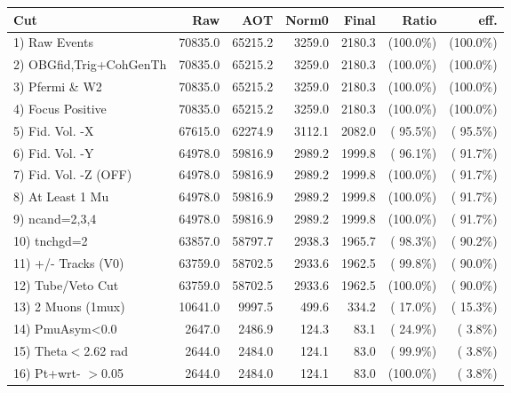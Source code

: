  \begin{table}[h!]\centering
 \begin{tabular}{||l||r|r|r|r|r|r||}
 \hline
 \hline
 Cut & Raw & AOT & Norm0 & Final & Ratio & eff.       \\
 \hline
  1) Raw Events           &      70835.0 &      65215.2 &       3259.0 &       2180.3 & (100.0\%) & (100.0\%) \\
  2) OBGfid,Trig+CohGenTh &      70835.0 &      65215.2 &       3259.0 &       2180.3 & (100.0\%) & (100.0\%) \\
  3) Pfermi \& W2         &      70835.0 &      65215.2 &       3259.0 &       2180.3 & (100.0\%) & (100.0\%) \\
  4) Focus Positive       &      70835.0 &      65215.2 &       3259.0 &       2180.3 & (100.0\%) & (100.0\%) \\
  5) Fid. Vol. -X         &      67615.0 &      62274.9 &       3112.1 &       2082.0 & ( 95.5\%) & ( 95.5\%) \\
  6) Fid. Vol. -Y         &      64978.0 &      59816.9 &       2989.2 &       1999.8 & ( 96.1\%) & ( 91.7\%) \\
  7) Fid. Vol. -Z (OFF)   &      64978.0 &      59816.9 &       2989.2 &       1999.8 & (100.0\%) & ( 91.7\%) \\
  8) At Least 1 Mu        &      64978.0 &      59816.9 &       2989.2 &       1999.8 & (100.0\%) & ( 91.7\%) \\
  9) ncand=2,3,4          &      64978.0 &      59816.9 &       2989.2 &       1999.8 & (100.0\%) & ( 91.7\%) \\
 10) tnchgd=2             &      63857.0 &      58797.7 &       2938.3 &       1965.7 & ( 98.3\%) & ( 90.2\%) \\
 11) +/- Tracks (V0)      &      63759.0 &      58702.5 &       2933.6 &       1962.5 & ( 99.8\%) & ( 90.0\%) \\
 12) Tube/Veto Cut        &      63759.0 &      58702.5 &       2933.6 &       1962.5 & (100.0\%) & ( 90.0\%) \\
 13) 2 Muons (1mux)       &      10641.0 &       9997.5 &        499.6 &        334.2 & ( 17.0\%) & ( 15.3\%) \\
 14) PmuAsym<0.0          &       2647.0 &       2486.9 &        124.3 &         83.1 & ( 24.9\%) & (  3.8\%) \\
 15) Theta$<$2.62 rad     &       2644.0 &       2484.0 &        124.1 &         83.0 & ( 99.9\%) & (  3.8\%) \\
 16) Pt+wrt- $>$0.05      &       2644.0 &       2484.0 &        124.1 &         83.0 & (100.0\%) & (  3.8\%) \\

\end{tabular}
\end{table}
